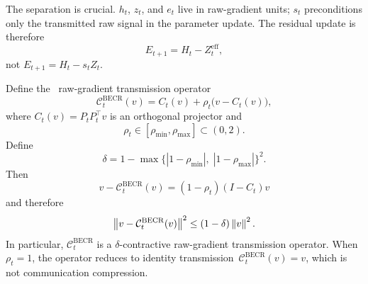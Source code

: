 The separation is crucial. $h_t$, $z_t$, and $e_t$ live in raw-gradient units;
$s_t$ preconditions only the transmitted raw signal in the parameter update.
The residual update is therefore
\[
E_{t+1}=H_t-Z_t^{\mathrm{eff}},
\]
not $E_{t+1}=H_t-s_t Z_t$.

\begin{proposition}
\label{prop:becr-contractivity}
Define the \BECR\ raw-gradient transmission operator
\[
\mathcal C_t^{\mathrm{BECR}}(v)=C_t(v)+\rho_t\bigl(v-C_t(v)\bigr),
\]
where $C_t(v)=P_tP_t^\top v$ is an orthogonal projector and
\[
\rho_t\in[\rho_{\min},\rho_{\max}] \subset (0,2).
\]
Define
\[
\delta=
1-\max\{|1-\rho_{\min}|,\;|1-\rho_{\max}|\}^2.
\]
Then
\[
v-\mathcal C_t^{\mathrm{BECR}}(v)=(1-\rho_t)(I-C_t)v
\]
and therefore
\[
\left\lVert v-\mathcal C_t^{\mathrm{BECR}}(v) \right\rVert^2
\le (1-\delta)\left\lVert v \right\rVert^2.
\]
In particular, $\mathcal C_t^{\mathrm{BECR}}$ is a $\delta$-contractive
raw-gradient transmission operator. When $\rho_t=1$, the operator reduces to
identity transmission $\,\mathcal C_t^{\mathrm{BECR}}(v)=v$, which is not
communication compression.
\end{proposition}
